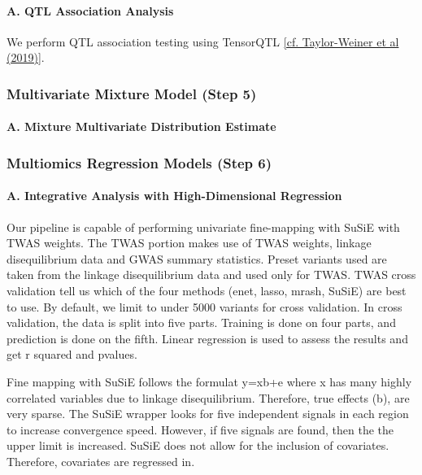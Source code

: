 \documentclass[12pt]{article}
\begin{document}
\paragraph*{A.  QTL Association Analysis}


We perform QTL association testing using TensorQTL \href{https://doi.org/10.1186/s13059-019-1836-7}{[cf. Taylor-Weiner et al (2019)}].

\subsubsection*{Multivariate Mixture Model (Step 5)}

\paragraph*{A.   Mixture Multivariate Distribution Estimate}


\subsubsection*{Multiomics Regression Models (Step 6)}

\paragraph*{A.  Integrative Analysis with High-Dimensional Regression}


Our pipeline is capable of performing univariate fine-mapping with SuSiE with TWAS weights. The TWAS portion makes use of TWAS weights, linkage disequilibrium data and GWAS summary statistics. Preset variants used are taken from the linkage disequilibrium data and used only for TWAS. TWAS cross validation tell us which of the four methods (enet, lasso, mrash, SuSiE) are best to use. By default, we limit to under 5000 variants for cross validation. In cross validation, the data is split into five parts. Training is done on four parts, and prediction is done on the fifth. Linear regression is used to assess the results and get r squared and pvalues.



Fine mapping with SuSiE follows the formulat y=xb+e where x has many highly correlated variables due to linkage disequilibrium. Therefore, true effects (b), are very sparse. The SuSiE wrapper looks for five independent signals in each region to increase convergence speed. However, if five signals are found, then the the upper limit is increased. SuSiE does not allow for the inclusion of covariates. Therefore, covariates are regressed in.
\end{document}
